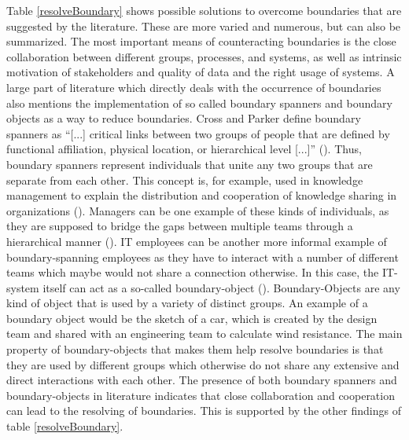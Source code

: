 Table \ref{resolveBoundary} shows possible solutions to overcome boundaries that are suggested by the literature. These are more varied and numerous, but can also be summarized. The most important means of counteracting  boundaries is the close collaboration between different groups, processes, and systems, as well as intrinsic motivation of stakeholders and quality of data and the right usage of systems. A large part of literature which directly deals with the occurrence of boundaries also mentions the implementation of so called boundary spanners and boundary objects as a way to reduce boundaries. Cross and Parker define boundary spanners as \enquote{[...] critical links between two groups of people that are defined by functional affiliation, physical location, or hierarchical level [...]} (\cite{Cross.2004}). %
Thus, boundary spanners represent individuals that unite any two groups that are separate from each other. This concept is, for example, used in knowledge management to explain the distribution and cooperation of knowledge sharing in organizations (\cite{Levina.2005}). Managers can be one example of these kinds of individuals, as they are supposed to bridge the gaps between multiple teams through a hierarchical manner (\cite{Allen.1969}). IT employees can be another more informal example of boundary-spanning employees as they have to interact with a number of different teams which maybe would not share a connection otherwise. In this case, the IT-system itself can act as a so-called boundary-object (\cite{Pawlowski.2004}). Boundary-Objects are any kind of object that is used by a variety of distinct groups. An example of a boundary object would be the sketch of a car, which is created by the design team and shared with an engineering team to calculate wind resistance. The main property of boundary-objects that makes them help resolve boundaries is that they are used by different groups which otherwise do not share any extensive and direct interactions with each other. The presence of both boundary spanners and boundary-objects in literature indicates that close collaboration and cooperation can lead to the resolving of boundaries. This is supported by the other findings of table \ref{resolveBoundary}.



